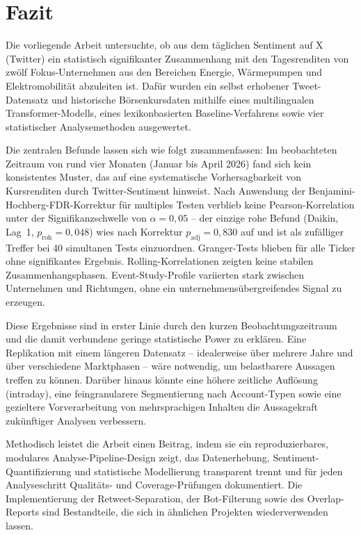 \section{Fazit}
\label{sec:fazit}

Die vorliegende Arbeit untersuchte, ob aus dem täglichen Sentiment auf X\,(Twitter) ein statistisch signifikanter Zusammenhang mit den Tagesrenditen von zwölf Fokus-Unternehmen aus den Bereichen Energie, Wärmepumpen und Elektromobilität abzuleiten ist. Dafür wurden ein selbst erhobener Tweet-Datensatz und historische Börsenkursdaten mithilfe eines multilingualen Transformer-Modells, eines lexikonbasierten Baseline-Verfahrens sowie vier statistischer Analysemethoden ausgewertet.

Die zentralen Befunde lassen sich wie folgt zusammenfassen: Im beobachteten Zeitraum von rund vier Monaten (Januar bis April 2026) fand sich kein konsistentes Muster, das auf eine systematische Vorhersagbarkeit von Kursrenditen durch Twitter-Sentiment hinweist. Nach Anwendung der Benjamini-Hochberg-FDR-Korrektur für multiples Testen verblieb keine Pearson-Korrelation unter der Signifikanzschwelle von $\alpha = 0{,}05$ -- der einzige rohe Befund (Daikin, Lag~1, $p_{\mathrm{roh}} = 0{,}048$) wies nach Korrektur $p_{\mathrm{adj}} = 0{,}830$ auf und ist als zufälliger Treffer bei 40 simultanen Tests einzuordnen. Granger-Tests blieben für alle Ticker ohne signifikantes Ergebnis. Rolling-Korrelationen zeigten keine stabilen Zusammenhangsphasen. Event-Study-Profile variierten stark zwischen Unternehmen und Richtungen, ohne ein unternehmensübergreifendes Signal zu erzeugen.

Diese Ergebnisse sind in erster Linie durch den kurzen Beobachtungszeitraum und die damit verbundene geringe statistische Power zu erklären. Eine Replikation mit einem längeren Datensatz -- idealerweise über mehrere Jahre und über verschiedene Marktphasen -- wäre notwendig, um belastbarere Aussagen treffen zu können. Darüber hinaus könnte eine höhere zeitliche Auflösung (intraday), eine feingranularere Segmentierung nach Account-Typen sowie eine gezieltere Vorverarbeitung von mehrsprachigen Inhalten die Aussagekraft zukünftiger Analysen verbessern.

Methodisch leistet die Arbeit einen Beitrag, indem sie ein reproduzierbares, modulares Analyse-Pipeline-Design zeigt, das Datenerhebung, Sentiment-Quantifizierung und statistische Modellierung transparent trennt und für jeden Analyseschritt Qualitäts- und Coverage-Prüfungen dokumentiert. Die Implementierung der Retweet-Separation, der Bot-Filterung sowie des Overlap-Reports sind Bestandteile, die sich in ähnlichen Projekten wiederverwenden lassen.
